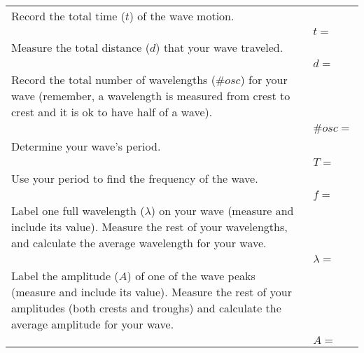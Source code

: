 \documentclass[10pt]{exam}
\begin{document}
\begin{tabular}{p{}p{}}
  \hline
  Record the total time ($t$) of the wave motion. \\
  & $t=$ \\\hline
  Measure the total distance ($d$) that your wave traveled. \\
  & $d=$ \\\hline
  Record the total number of wavelengths ($\#osc$) for your wave (remember, a wavelength is measured from crest to crest and it is ok to have half of a wave). \\
  & $\#osc=$ \\\hline
  Determine your wave's period. \\
  & $T=$ \\\hline
  Use your period to find the frequency of the wave. \\
  & $f=$ \\\hline
  Label one full wavelength ($\lambda$) on your wave (measure and include its value).  Measure the rest of your wavelengths, and calculate the average wavelength for your wave. \\
  & $\lambda=$ \\\hline
  Label the amplitude ($A$) of one of the wave peaks (measure and include its value).  Measure the rest of your amplitudes (both crests and troughs) and calculate the average amplitude for your wave. \\
  & $A=$ \\\hline
\end{tabular}

\pagebreak
\end{document}

